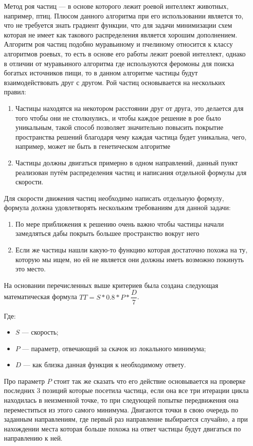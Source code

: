 \documentclass[14pt]{extarticle} %
\begin{document}
Метод роя частиц --- в основе которого лежит роевой интеллект животных, например, птиц. Плюсом данного алгоритма при его использовании является то, что не требуется знать градиент функции, что для задачи минимизации схем которая не имеет как такового распределения является хорошим дополнением. Алгоритм роя частиц подобно муравьиному и пчелиному относится к классу алгоритмов роевых, то есть в основе его работы лежит роевой интеллект, однако в отличии от муравьиного алгоритма где используются феромоны для поиска богатых источников пищи, то в данном алгоритме частицы будут взаимодействовать друг с другом. Рой частиц основывается на нескольких правил:
\begin{enumerate}
	\item Частицы находятся на некотором расстоянии друг от друга, это делается для того чтобы они не столкнулись, и чтобы каждое решение в рое было уникальным, такой способ позволяет значительно повысить покрытие пространства решений благодаря чему каждая частица будет уникальна, чего, например, может не быть в генетическом алгоритме
	\item Частицы должны двигаться примерно в одном направлений, данный пункт реализован путём распределения частиц и написания отдельной формулы для скорости.
\end{enumerate}
Для скорости движения частиц необходимо написать отдельную формулу, формула должна удовлетворять нескольким требованиям для данной задачи:
\begin{enumerate}
	\item По мере приближения к решению очень важно чтобы частицы начали замедляться дабы покрыть большее пространство вокруг него
	\item Если же частицы нашли какую-то функцию которая достаточно похожа на ту, которую мы ищем, но ей не является они должны иметь возможно покинуть это место.
\end{enumerate}
На основании перечисленных выше критериев была создана следующая математическая формула $TT=S*0.8*P*\dfrac{D}{7}$.\par
Где: \begin{itemize}
	\item $S$ --- скорость;
	\item $P$ --- параметр, отвечающий за скачок из локального минимума;
	\item $D$ --- как близка данная функция к необходимому ответу.
\end{itemize}
Про параметр $P$ стоит так же сказать что его действие основывается на проверке последних 3 позиций которые посетила частица, если она все три итерации цикла находилась в неизменной точке, то при следующей попытке передвижения она переместиться из этого самого минимума. Двигаются точки в свою очередь по заданным направлениям, где первый раз направление выбирается случайно, а при нахождении места которая больше похожа на ответ частицы будут двигаться по направлению к ней.
\end{document}
